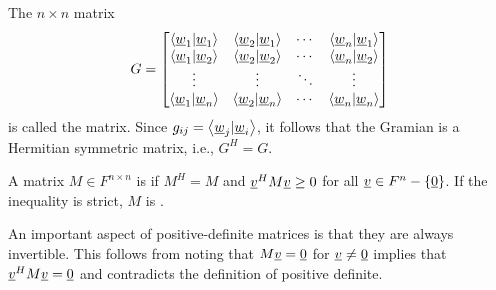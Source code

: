 \begin{definition}
The $n \times n$ matrix
\begin{equation} \label{equation:GramianMatrix}
G = \begin{bmatrix}
\left\langle \underline{w}_1 | \underline{w}_1 \right\rangle
& \left\langle \underline{w}_2 | \underline{w}_1 \right\rangle & \cdots
& \left\langle \underline{w}_n | \underline{w}_1 \right\rangle \\
\left\langle \underline{w}_1 | \underline{w}_2 \right\rangle
& \left\langle \underline{w}_2 | \underline{w}_2 \right\rangle & \cdots
& \left\langle \underline{w}_n | \underline{w}_2 \right\rangle \\
\vdots & \vdots & \ddots & \vdots \\
\left\langle \underline{w}_1 | \underline{w}_n \right\rangle
& \left\langle \underline{w}_2 | \underline{w}_n \right\rangle & \cdots
& \left\langle \underline{w}_n | \underline{w}_n \right\rangle
\end{bmatrix}
\end{equation}
is called the  matrix.
Since $g_{ij} = \left\langle \underline{w}_j | \underline{w}_i \right\rangle$, it follows that the Gramian is a Hermitian symmetric matrix, i.e., $G^H = G$.
\end{definition}

\begin{definition}
A matrix $M\in F^{n \times n}$ is  if $M^H \!=\! M$ and $\underline{v}^H M \underline{v} \geq 0$ for all $\underline{v} \in F^n - \left\{ \underline{0} \right\}$.
If the inequality is strict, $M$ is .
\end{definition}

An important aspect of positive-definite matrices is that they are always invertible.
This follows from noting that $M\underline{v} = \underline{0}$ for $\underline{v}\neq\underline{0}$ implies that $\underline{v}^H M \underline{v} = \underline{0}$ and contradicts the definition of positive definite.

